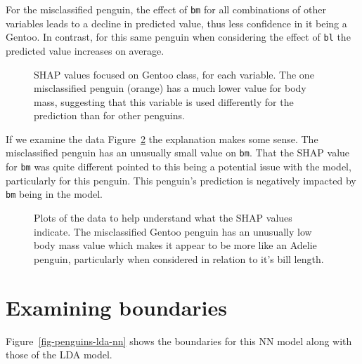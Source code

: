 \documentclass[
  letterpaper,
]{krantz}
\begin{document}
For the misclassified penguin, the effect of \texttt{bm} for all
combinations of other variables leads to a decline in predicted value,
thus less confidence in it being a Gentoo. In contrast, for this same
penguin when considering the effect of \texttt{bl} the predicted value
increases on average.

\begin{figure}


\caption{\label{fig-shapley-pcp}SHAP values focused on Gentoo class, for
each variable. The one misclassified penguin (orange) has a much lower
value for body mass, suggesting that this variable is used differently
for the prediction than for other penguins.}

\end{figure}%

If we examine the data Figure~\ref{fig-penguins-bl-bm-bd} the
explanation makes some sense. The misclassified penguin has an unusually
small value on \texttt{bm}. That the SHAP value for \texttt{bm} was
quite different pointed to this being a potential issue with the model,
particularly for this penguin. This penguin's prediction is negatively
impacted by \texttt{bm} being in the model.

\begin{figure}


\caption{\label{fig-penguins-bl-bm-bd}Plots of the data to help
understand what the SHAP values indicate. The misclassified Gentoo
penguin has an unusually low body mass value which makes it appear to be
more like an Adelie penguin, particularly when considered in relation to
it's bill length.}

\end{figure}%

\section{Examining boundaries}\label{examining-boundaries}

Figure~\ref{fig-penguins-lda-nn} shows the boundaries for this NN model
along with those of the LDA model.
\end{document}
